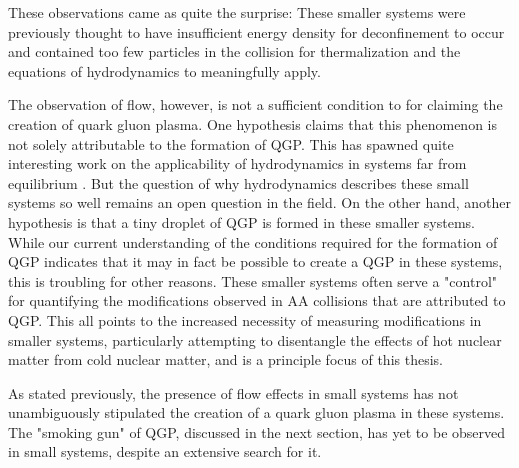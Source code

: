 These observations came as quite the surprise: These smaller systems were previously thought to have insufficient energy density for deconfinement to occur and contained too few particles in the collision for thermalization and the equations of hydrodynamics to meaningfully apply.


The observation of flow, however, is not a sufficient condition to for claiming the creation of quark gluon plasma. One hypothesis claims that this phenomenon is not solely attributable to the formation of QGP. This has spawned quite interesting work on the applicability of hydrodynamics in systems far from equilibrium \cite{Romatschke2018a}. But the question of why hydrodynamics describes these small systems so well remains an open question in the field. On the other hand, another hypothesis is that a tiny droplet of QGP is formed in these smaller systems. While our current understanding of the conditions required for the formation of QGP indicates that it may in fact be possible to create a QGP in these systems, this is troubling for other reasons. These smaller systems often serve a "control" for quantifying the modifications observed in AA collisions that are attributed to QGP. This all points to the increased necessity of measuring modifications in smaller systems, particularly attempting to disentangle the effects of hot nuclear matter from cold nuclear matter, and is a principle focus of this thesis.

As stated previously, the presence of flow effects in small systems has not unambiguously stipulated the creation of a quark gluon plasma in these systems. The "smoking gun" of QGP, discussed in the next section, has yet to be observed in small systems, despite an extensive search for it.



